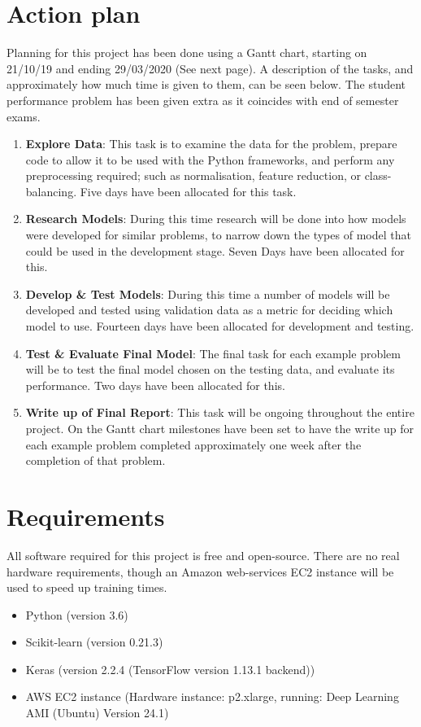 \documentclass[12pt,a4paper,titlepage]{book}
\begin{document}
\chapter{Action plan}
	Planning for this project has been done using a Gantt chart, starting on 21/10/19 and ending 29/03/2020 (See next page). A description of the tasks, and approximately how much time is given to them, can be seen below. The student performance problem has been given extra as it coincides with end of semester exams.
\begin{enumerate}
\item \textbf{Explore Data}: This task is to examine the data for the problem, prepare code to allow it to be used with the Python frameworks, and perform any preprocessing required; such as normalisation, feature reduction, or class-balancing. Five days have been allocated for this task.
\item \textbf{Research Models}: During this time research will be done into how models were developed for similar problems, to narrow down the types of model that could be used in the development stage. Seven Days have been allocated for this.
\item \textbf{Develop \& Test Models}: During this time a number of models will be developed and tested using validation data as a metric for deciding which model to use. Fourteen days have been allocated for development and testing.
\item \textbf{Test \& Evaluate Final Model}: The final task for each example problem will be to test the final model chosen on the testing data, and evaluate its performance. Two days have been allocated for this.
\item \textbf{Write up of Final Report}: This task will be ongoing throughout the entire project. On the Gantt chart milestones have been set to have the write up for each example problem completed approximately one week after the completion of that problem.
\end{enumerate}


\chapter{Requirements}
	All software required for this project is free and open-source. There are no real hardware requirements, though an Amazon web-services EC2 instance will be used to speed up training times.
\begin{itemize}
\item Python (version 3.6)
\item Scikit-learn (version 0.21.3)
\item Keras (version 2.2.4 (TensorFlow version 1.13.1 backend))
\item AWS EC2 instance (Hardware instance: p2.xlarge, running: Deep Learning AMI (Ubuntu) Version 24.1)
\end{itemize}

\printbibliography
\end{document}
